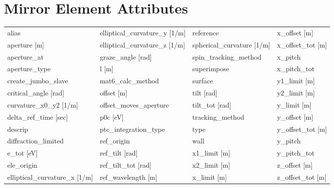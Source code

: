  \section{Mirror Element Attributes}
 \label{s:list.mirror}
 
 \begin{tabular}{llll} \toprule
alias                          & elliptical_curvature_y [1/m]   & reference                      & x_offset [m]                   \\
aperture [m]                   & elliptical_curvature_z [1/m]   & spherical_curvature [1/m]      & x_offset_tot [m]               \\
aperture_at                    & graze_angle [rad]              & spin_tracking_method           & x_pitch                        \\
aperture_type                  & l [m]                          & superimpose                    & x_pitch_tot                    \\
create_jumbo_slave             & mat6_calc_method               & surface                        & y1_limit [m]                   \\
critical_angle [rad]           & offset [m]                     & tilt [rad]                     & y2_limit [m]                   \\
curvature_x0_y2 [1/m]          & offset_moves_aperture          & tilt_tot [rad]                 & y_limit [m]                    \\
delta_ref_time [sec]           & p0c [eV]                       & tracking_method                & y_offset [m]                   \\
descrip                        & ptc_integration_type           & type                           & y_offset_tot [m]               \\
diffraction_limited            & ref_origin                     & wall                           & y_pitch                        \\
e_tot [eV]                     & ref_tilt [rad]                 & x1_limit [m]                   & y_pitch_tot                    \\
ele_origin                     & ref_tilt_tot [rad]             & x2_limit [m]                   & z_offset [m]                   \\
elliptical_curvature_x [1/m]   & ref_wavelength [m]             & x_limit [m]                    & z_offset_tot [m]               \\
 \bottomrule
 \end{tabular}
 \vfill
 

